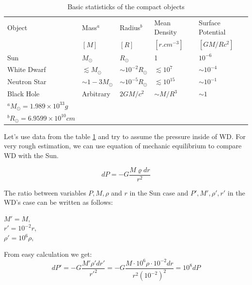 \documentclass[oneside,a4paper,11pt]{report}
\begin{document}
\begin{table}[hbt!]
\caption{Basic statisticks of the compact objects \citet{2004bhwd.book.....S}}
\centering
\begin{tabular}{lllll}
\hline
\hline
Object & Mass$^a$ & Radius$^b$ & Mean Density & Surface Potential  \\
       & $[M]$ & $[R]$ & $[r.cm^{-3}]$& $[GM/Rc^2]$                    \\
\hline
Sun         & $M_{\odot}$            & $R_{\odot}$             &1                  &$10^{-6}$ \\
White Dwarf & $\lesssim M_{\odot}$   & $\sim 10^{-2}R_{\odot}$ & $\lesssim 10^7$   &$\sim 10^{-4}$ \\
Neutron Star& $\sim1-3M_{\odot}$     & $\sim 10^{-5}R_{\odot}$ & $\lesssim 10^{15}$& $\sim 10^{-1}$\\
Black Hole  & Arbitrary              & $2GM/c^2$               & $\sim M/R^3$      & $\sim1$\\
\hline
\footnotesize
$^a M_{\odot}=1.989 \times 10^{33} g$ &&&& \\
\footnotesize
$^b R_{\odot}=6.9599 \times 10^{10} cm$ &&&& \\
\end{tabular}
\label{comobj1}
\end{table}

Let's use data from the table \ref{comobj1} and try to assume the pressure inside of WD. For very 
rough estimation, we can use equation of mechanic equilibrium to compare WD with the Sun.

\begin{equation}
 dP = -G\frac{M \varrho  dr}{r^2}
\end{equation}

The ratio between variables $P, M, \rho$ and $r$ in the Sun case and $P', M', \rho', r'$ in the WD's 
case can be written as follows:

\begin{center}
 $M' = M ,$  \\
 $r' = 10^{-2}r,$ \\
 $\rho' = 10^6 \rho,$ \\
\end{center}

From easy calculation we get: 
\begin{equation}
 dP' = -G\frac{M' \rho' dr'}{r'^2} = -G\frac{M \cdot 10^6 \rho \cdot 10^{-2} dr}{r^2 (10^{-2})^2} = 10^{8} dP
\end{equation}
\end{document}
